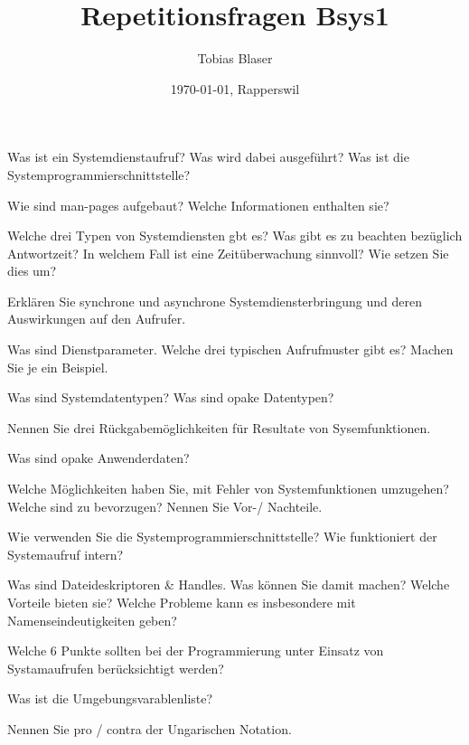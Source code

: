 \documentclass[ngerman,a4paper,12pt]{scrreprt}
\title{Repetitionsfragen Bsys1}
\author{Tobias Blaser}
\date{\today{}, Rapperswil}
\begin{document}
\tableofcontents
\clearpage

\ol
	\li
\olS


\olR
	\li
\olS


\olR
	\li
\olS


\olR
	\item Was ist ein Systemdienstaufruf? Was wird dabei ausgeführt? Was ist die Systemprogrammierschnittstelle?
	\item Wie sind man-pages aufgebaut? Welche Informationen enthalten sie?
	\item Welche drei Typen von Systemdiensten gbt es? Was gibt es zu beachten bezüglich Antwortzeit? In welchem Fall ist eine Zeitüberwachung sinnvoll? Wie setzen Sie dies um?
	\item Erklären Sie synchrone und asynchrone Systemdiensterbringung und deren Auswirkungen auf den Aufrufer.
	\item Was sind Dienstparameter. Welche drei typischen Aufrufmuster gibt es? Machen Sie je ein Beispiel.
	\item Was sind Systemdatentypen? Was sind opake Datentypen?
	\item Nennen Sie drei Rückgabemöglichkeiten für Resultate von Sysemfunktionen.
	\item Was sind opake Anwenderdaten?
	\item Welche Möglichkeiten haben Sie, mit Fehler von Systemfunktionen umzugehen? Welche sind zu bevorzugen? Nennen Sie Vor-/ Nachteile.
	\item Wie verwenden Sie die Systemprogrammierschnittstelle? Wie funktioniert der Systemaufruf intern?
	\item Was sind Dateideskriptoren \& Handles. Was können Sie damit machen? Welche Vorteile bieten sie? Welche Probleme kann es insbesondere mit Namenseindeutigkeiten geben?
	\item Welche 6 Punkte sollten bei der Programmierung unter Einsatz von Systamaufrufen berücksichtigt werden?
	\item Was ist die Umgebungsvarablenliste?
	\item Nennen Sie pro / contra der Ungarischen Notation.
\olS
\end{document}
